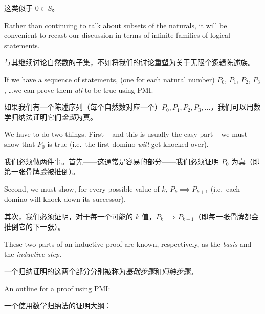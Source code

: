 这类似于 $0 \in S$。

Rather than continuing to talk about subsets of the naturals, it will
be convenient to recast our discussion in terms of infinite families
of logical statements.

与其继续讨论自然数的子集，不如将我们的讨论重塑为关于无限个逻辑陈述族。

If we have a sequence of statements, (one
for each natural number) $P_0$, $P_1$, $P_2$, $P_3$, \ldots  we
can prove them \emph{all} to be true using PMI.

如果我们有一个陈述序列（每个自然数对应一个）$P_0, P_1, P_2, P_3, \ldots$，我们可以用数学归纳法证明它们\emph{全部}为真。

We have to do two
things.   First -- and this is usually the easy part -- we must show 
that $P_0$ is true (i.e.\ the first domino \emph{will} get knocked over).

我们必须做两件事。首先——这通常是容易的部分——我们必须证明 $P_0$ 为真（即第一张骨牌\emph{会}被推倒）。

Second, we must show, for every possible value of $k$, $P_k \implies P_{k+1}$
(i.e.\ each domino will knock down its successor).

其次，我们必须证明，对于每一个可能的 $k$ 值，$P_k \implies P_{k+1}$（即每一张骨牌都会推倒它的下一张）。

These two parts 
of an inductive proof are known, respectively, as the \emph{basis}
and the \emph{inductive step}.

一个归纳证明的这两个部分分别被称为\emph{基础步骤}和\emph{归纳步骤}。

An outline for a proof using PMI:

一个使用数学归纳法的证明大纲：

